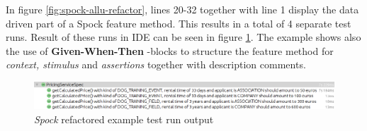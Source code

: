     \restoregeometry
    In figure \ref{fig:spock-allu-refactor}, lines 20-32 together with line 1 display the data driven part of a Spock
    feature method. This results in a total of
    4 separate test runs. Result of these runs in IDE can be seen in figure \ref{fig:spock-allu-refactor-output}. The
    example shows also the use of \textbf{Given-When-Then} -blocks to structure the feature method for \textit{context, stimulus}
    and \textit{assertions} together with description comments.

    \begin{figure}[H]
      \begin{center}
        \begin{topbot}[style=mdstyle]
        \includegraphics[width=\textwidth]{images/spock-pricing-results.png}
        \end{topbot}
        \caption{\textit{Spock} refactored example test run output}
        \label{fig:spock-allu-refactor-output}
      \end{center}
    \end{figure}

